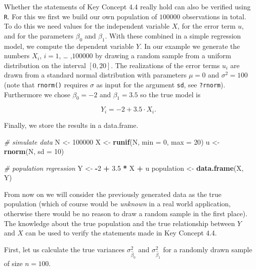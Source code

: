 \documentclass[]{book}
\newenvironment{Shaded}{\begin{snugshade}}{\end{snugshade}}
\newcommand{\KeywordTok}[1]{\textcolor[rgb]{0.13,0.29,0.53}{\textbf{#1}}}
\newcommand{\DataTypeTok}[1]{\textcolor[rgb]{0.13,0.29,0.53}{#1}}
\newcommand{\DecValTok}[1]{\textcolor[rgb]{0.00,0.00,0.81}{#1}}
\newcommand{\FloatTok}[1]{\textcolor[rgb]{0.00,0.00,0.81}{#1}}
\newcommand{\StringTok}[1]{\textcolor[rgb]{0.31,0.60,0.02}{#1}}
\newcommand{\CommentTok}[1]{\textcolor[rgb]{0.56,0.35,0.01}{\textit{#1}}}
\newcommand{\OperatorTok}[1]{\textcolor[rgb]{0.81,0.36,0.00}{\textbf{#1}}}
\newcommand{\NormalTok}[1]{#1}
\theoremstyle{definition}
\theoremstyle{definition}
\theoremstyle{definition}
\theoremstyle{remark}
\begin{document}
Whether the statements of Key Concept 4.4 really hold can also be
verified using \texttt{R}. For this we first we build our own population
of \(100000\) observations in total. To do this we need values for the
independent variable \(X\), for the error term \(u\), and for the
parameters \(\beta_0\) and \(\beta_1\). With these combined in a simple
regression model, we compute the dependent variable \(Y\). In our
example we generate the numbers \(X_i\), \(i = 1\), \ldots{} ,\(100000\)
by drawing a random sample from a uniform distribution on the interval
\([0,20]\). The realizations of the error terms \(u_i\) are drawn from a
standard normal distribution with parameters \(\mu = 0\) and
\(\sigma^2 = 100\) (note that \texttt{rnorm()} requires \(\sigma\) as
input for the argument \texttt{sd}, see \texttt{?rnorm}). Furthermore we
chose \(\beta_0 = -2\) and \(\beta_1 = 3.5\) so the true model is

\[ Y_i = -2 + 3.5 \cdot X_i. \]

Finally, we store the results in a data.frame.

\begin{Shaded}
\begin{Highlighting}[]
\CommentTok{# simulate data}
\NormalTok{N <-}\StringTok{ }\DecValTok{100000}
\NormalTok{X <-}\StringTok{ }\KeywordTok{runif}\NormalTok{(N, }\DataTypeTok{min =} \DecValTok{0}\NormalTok{, }\DataTypeTok{max =} \DecValTok{20}\NormalTok{)}
\NormalTok{u <-}\StringTok{ }\KeywordTok{rnorm}\NormalTok{(N, }\DataTypeTok{sd =} \DecValTok{10}\NormalTok{)}

\CommentTok{# population regression}
\NormalTok{Y <-}\StringTok{ }\OperatorTok{-}\DecValTok{2} \OperatorTok{+}\StringTok{ }\FloatTok{3.5} \OperatorTok{*}\StringTok{ }\NormalTok{X }\OperatorTok{+}\StringTok{ }\NormalTok{u}
\NormalTok{population <-}\StringTok{ }\KeywordTok{data.frame}\NormalTok{(X, Y)}
\end{Highlighting}
\end{Shaded}

From now on we will consider the previously generated data as the true
population (which of course would be \emph{unknown} in a real world
application, otherwise there would be no reason to draw a random sample
in the first place). The knowledge about the true population and the
true relationship between \(Y\) and \(X\) can be used to verify the
statements made in Key Concept 4.4.

First, let us calculate the true variances \(\sigma^2_{\hat{\beta}_0}\)
and \(\sigma^2_{\hat{\beta}_1}\) for a randomly drawn sample of size
\(n = 100\).
\end{document}
